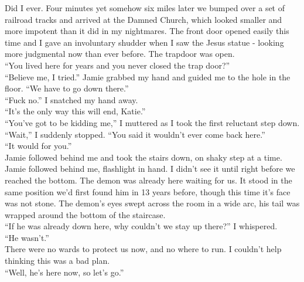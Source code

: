 \documentclass[a5paper]{scrartcl}
\begin{document}
Did I ever. Four minutes yet somehow six miles later we bumped over a set of railroad tracks and arrived at the Damned Church, which looked smaller and more impotent than it did in my nightmares. The front door opened easily this time and I gave an involuntary shudder when I saw the Jesus statue - looking more judgmental now than ever before. The trapdoor was open.\\


\enquote{You lived here for years and you never closed the trap door?} \\


\enquote{Believe me, I tried.} Jamie grabbed my hand and guided me to the hole in the floor. \enquote{We have to go down there.}\\


\enquote{Fuck no.} I snatched my hand away.\\


\enquote{It's the only way this will end, Katie.}\\


\enquote{You've got to be kidding me,} I muttered as I took the first reluctant step down.\\


\enquote{Wait,} I suddenly stopped. \enquote{You said it wouldn't ever come back here.}\\


\enquote{It would for you.} \\


Jamie followed behind me and took the stairs down, on shaky step at a time. Jamie followed behind me, flashlight in hand. I didn't see it until right before we reached the bottom. The demon was already here waiting for us. It stood in the same position we'd first found him in 13 years before, though this time it's face was not stone. The demon's eyes swept across the room in a wide arc, his tail was wrapped around the bottom of the staircase.\\


\enquote{If he was already down here, why couldn't we stay up there?} I whispered.\\


\enquote{He wasn't.}\\


There were no wards to protect us now, and no where to run. I couldn't help thinking this was a bad plan.\\


\enquote{Well, he's here now, so let's go.}\\
\end{document}

